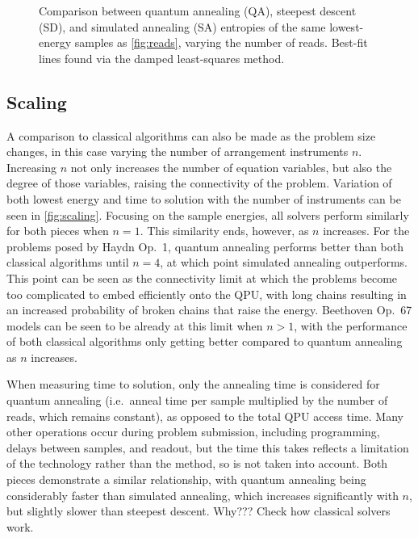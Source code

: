 \documentclass[12pt]{article}
\theoremstyle{definition}
\begin{document}
\begin{figure}[ht]
    \centering\footnotesize
    
    \caption{Comparison between quantum annealing (QA), steepest descent (SD), and simulated annealing (SA) entropies of the same lowest-energy samples as \cref{fig:reads}, varying the number of reads. Best-fit lines found via the damped least-squares method.}
    \label{fig:entropy}
\end{figure}

\subsection{Scaling}

A comparison to classical algorithms can also be made as the problem size changes, in this case varying the number of arrangement instruments $n$. Increasing $n$ not only increases the number of equation variables, but also the degree of those variables, raising the connectivity of the problem. Variation of both lowest energy and time to solution with the number of instruments can be seen in \cref{fig:scaling}. Focusing on the sample energies, all solvers perform similarly for both pieces when $n=1$. This similarity ends, however, as $n$ increases. For the problems posed by Haydn Op.\ 1, quantum annealing performs better than both classical algorithms until $n=4$, at which point simulated annealing outperforms. This point can be seen as the connectivity limit at which the problems become too complicated to embed efficiently onto the QPU, with long chains resulting in an increased probability of broken chains that raise the energy. Beethoven Op.\ 67 models can be seen to be already at this limit when $n>1$, with the performance of both classical algorithms only getting better compared to quantum annealing as $n$ increases.

When measuring time to solution, only the annealing time is considered for quantum annealing (i.e.\ anneal time per sample multiplied by the number of reads, which remains constant), as opposed to the total QPU access time. Many other operations occur during problem submission, including programming, delays between samples, and readout, but the time this takes reflects a limitation of the technology rather than the method, so is not taken into account. Both pieces demonstrate a similar relationship, with quantum annealing being considerably faster than simulated annealing, which increases significantly with $n$, but slightly slower than steepest descent. Why??? Check how classical solvers work.
\end{document}
